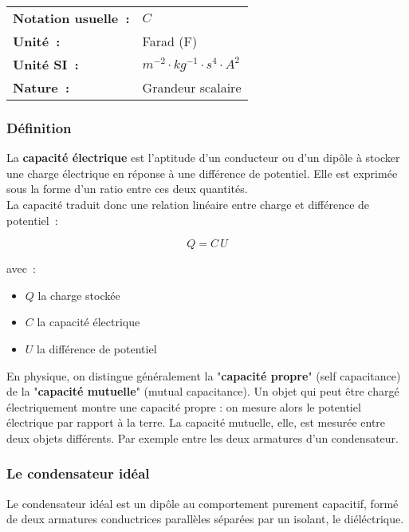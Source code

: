 \vspace{0.5cm}
\begin{tabular}{ll}
\textbf{Notation usuelle~:} & $C$ \\
\textbf{Unité~:} & Farad (F) \\
	\textbf{Unité SI~:} & $m^{-2} \cdot kg^{-1} \cdot {s}^{4} \cdot A^{2}$ \\
\textbf{Nature~:} & Grandeur scalaire \\
\end{tabular} 

\subsubsection*{Définition}


La \textbf{capacité électrique} est l'aptitude d'un conducteur ou d'un dipôle à stocker une charge électrique en réponse à une différence de potentiel. Elle est exprimée sous la forme d'un ratio entre ces deux quantités. \\

La capacité traduit donc une relation linéaire entre charge et différence de potentiel~:

\begin{equation}
	Q = C\,U
\end{equation}

avec~:\\
\begin{itemize}
	\item $Q$ la charge stockée
	\item $C$ la capacité électrique
	\item $U$ la différence de potentiel\\
\end{itemize}

En physique, on distingue généralement la "\textbf{capacité propre}" (self capacitance) de la "\textbf{capacité mutuelle}" (mutual capacitance). Un objet qui peut être chargé électriquement montre une capacité propre : on mesure alors le potentiel électrique par rapport à la terre. La capacité mutuelle, elle, est mesurée entre deux objets différents. Par exemple entre les deux armatures d'un condensateur. \\

\subsubsection{Le condensateur idéal}

Le condensateur idéal est un dipôle au comportement purement capacitif, formé de deux armatures conductrices parallèles séparées par un isolant, le diéléctrique. \\





